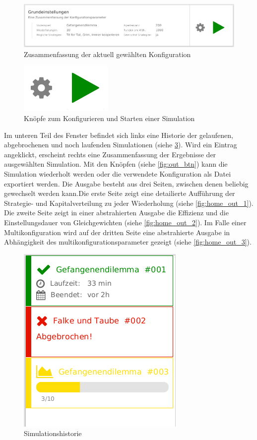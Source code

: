 \documentclass[parskip=full,11pt]{scrartcl}
\begin{document}
\begin{figure}[hb]
	\centering
	\includegraphics[width=\textwidth]{images/home_top.png}
	\caption{\label{fig:home_top}
	Zusammenfassung der aktuell gewählten Konfiguration}
\end{figure} 
 
\begin{figure}[ht]
	\centering
 	\includegraphics[width=0.25\linewidth]{images/main_btn.png}
 	\caption{\label{fig:main_btn}
 		Knöpfe zum Konfigurieren und Starten einer Simulation}
\end{figure}


\newpage
Im unteren Teil des Fenster befindet sich links eine Historie der gelaufenen, abgebrochenen und noch laufenden Simulationen (siehe \cref{fig:history}). Wird ein Eintrag angeklickt, erscheint rechts eine Zusammenfassung der Ergebnisse der ausgewählten Simulation. Mit den Knöpfen (siehe \cref{fig:out_btn}) kann die Simulation wiederholt werden oder die verwendete Konfiguration als Datei exportiert werden. Die Ausgabe besteht aus drei Seiten, zwischen denen beliebig gewechselt werden kann.Die erste Seite zeigt eine detailierte Aufführung der Strategie- und Kapitalverteilung zu jeder Wiederholung (siehe \cref{fig:home_out_1}). Die zweite Seite zeigt in einer abstrahierten Ausgabe die Effizienz und die Einstellungsdauer von Gleichgewichten (siehe \cref{fig:home_out_2}). Im Falle einer Multikonfiguration wird auf der dritten Seite eine abstrahierte Ausgabe in Abhängigkeit des multikonfigurationsparameter gezeigt (siehe \cref{fig:home_out_3}).



\begin{figure}[hb]
	\centering
	\includegraphics[height=0.5\linewidth ]{images/history.png}
	\caption{\label{fig:history}
		Simulationshistorie }
\end{figure}
\end{document}
